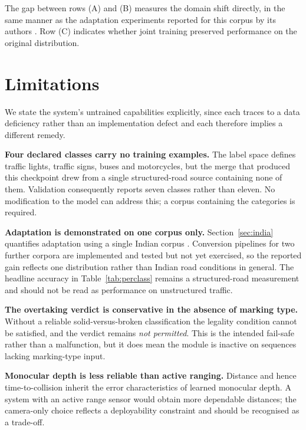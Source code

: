 \documentclass[conference]{IEEEtran}
\begin{document}
The gap between rows (A) and (B) measures the domain shift directly, in the same
manner as the adaptation experiments reported for this corpus by its authors
\cite{iisc2025uvh26}. Row (C) indicates whether joint training preserved
performance on the original distribution.

\section{Limitations}
\label{sec:limits}

We state the system's untrained capabilities explicitly, since each traces to a
data deficiency rather than an implementation defect and each therefore implies a
different remedy.

\textbf{Four declared classes carry no training examples.} The label space
defines traffic lights, traffic signs, buses and motorcycles, but the merge that
produced this checkpoint drew from a single structured-road source containing
none of them. Validation consequently reports seven classes rather than eleven.
No modification to the model can address this; a corpus containing the
categories is required.

\textbf{Adaptation is demonstrated on one corpus only.} Section~\ref{sec:india}
quantifies adaptation using a single Indian corpus \cite{iisc2025uvh26}.
Conversion pipelines for two further corpora
\cite{varma2019idd, kumar2025driveindia} are implemented and tested but not yet
exercised, so the reported gain reflects one distribution rather than Indian
road conditions in general. The headline accuracy in
Table~\ref{tab:perclass} remains a structured-road measurement and should not be
read as performance on unstructured traffic.

\textbf{The overtaking verdict is conservative in the absence of marking type.}
Without a reliable solid-versus-broken classification the legality condition
cannot be satisfied, and the verdict remains \textit{not permitted}. This is the
intended fail-safe rather than a malfunction, but it does mean the module is
inactive on sequences lacking marking-type input.

\textbf{Monocular depth is less reliable than active ranging.} Distance and hence
time-to-collision inherit the error characteristics of learned monocular depth. A
system with an active range sensor would obtain more dependable distances; the
camera-only choice reflects a deployability constraint and should be recognised
as a trade-off.
\end{document}
